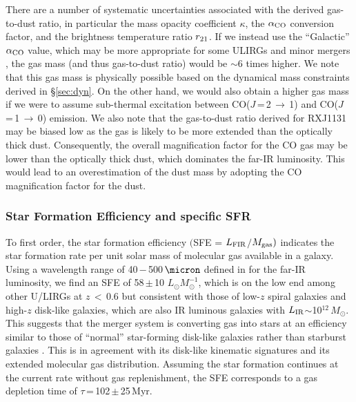 \documentclass[]{emulateapj}
\newcommand{\Msun}{\mbox{$M_{\odot}$}\xspace}
\newcommand{\Lsun}{\mbox{$L_{\odot}$}\xspace}
\newcommand{\LIR}{\mbox{$L_{\rm IR}$}\xspace}
\newcommand{\LFIR}{\mbox{$L_{\rm FIR}$}\xspace}
\newcommand{\rarr}{$\rightarrow$}
\newcommand{\aco}{\mbox{CO($J$\,=\,1\,\rarr\,0)}\xspace}
\newcommand{\bco}{\mbox{CO($J$\,=\,2\,\rarr\,1)}\xspace}
\newcommand{\alphaco}{\mbox{$\alpha_{\rm CO}$}\xspace}
\newcommand{\pmm}{\,$\pm$\,}
\newcommand{\eg}{{e.g.,~}}
\newcommand{\Sec}[1]{\S\ref{sec:#1}}
\newcommand{\SF}{star formation\xspace}
\newcommand{\fir}{far-IR\xspace}
\begin{document}
There are a number of systematic uncertainties associated with the derived gas-to-dust ratio, in particular
the mass opacity coefficient $\kappa$,
the \alphaco conversion factor, and the brightness temperature ratio $r_{\rm 21}$.
If we instead use the ``Galactic'' \alphaco value, which may be more appropriate for some ULIRGs \citep[\eg][]{Papadopoulos12a} and minor mergers \citep{Narayanan12a},
the gas mass (and thus gas-to-dust ratio) would be $\sim$6 times higher.
We note that this gas mass is physically possible based on the dynamical mass constraints derived in \Sec{dyn}.
On the other hand, we would also obtain a higher gas mass if
we were to assume sub-thermal excitation between \bco and \aco emission.
We also note that the gas-to-dust ratio derived for RXJ1131 may be biased low as the gas is likely to
be more extended than the optically thick dust. Consequently, the overall magnification factor
for the CO gas may be lower than the optically thick dust, which dominates the \fir luminosity.
This would lead to an overestimation of the dust mass
by adopting the CO magnification factor for the dust.

\subsubsection{Star Formation Efficiency and specific SFR}

To first order, the star formation efficiency
$($SFE = \LFIR$/$$M_{\rm gas})$ indicates the \SF rate per unit solar mass of molecular gas available in a galaxy.
Using a wavelength range of 40\,$-$\,500\,$\micron$ defined
in  for the far-IR luminosity,
we find an SFE of 58\pmm10 \Lsun $M_{\odot}^{-1}$,
which is on the low end among other U/LIRGs at $z$\,$<$\,0.6
\citep[;][]{Combes11a} but consistent with those of
low-$z$ spiral galaxies \citep[$z$\,$<$\,0.1;][]{SV05a} and high-$z$ disk-like
galaxies, which are also IR luminous galaxies with \LIR$\sim$10$^{12}$\,\Msun \citep{Daddi08a, Daddi10a}.
This suggests that the merger system is converting gas into stars at an efficiency
similar to those of ``normal'' star-forming
disk-like galaxies rather than starburst galaxies
\citep[][]{Tacconi08a, Riechers11a}.
This is in agreement with its disk-like kinematic signatures and its extended molecular gas distribution.
Assuming the \SF continues at the current rate without gas replenishment,
the SFE corresponds to a
gas depletion time of $\tau$\,=\,102\pmm25\,Myr.
\end{document}
